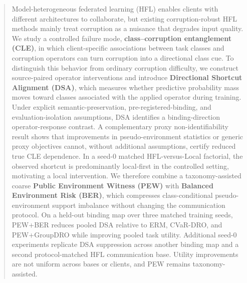 \begin{abstract}

Model-heterogeneous federated learning (HFL) enables clients with different architectures to collaborate, but existing corruption-robust HFL methods mainly treat corruption as a nuisance that degrades input quality. We study a controlled failure mode, \textbf{class--corruption entanglement (CLE)}, in which client-specific associations between task classes and corruption operators can turn corruption into a directional class cue. To distinguish this behavior from ordinary corruption difficulty, we construct source-paired operator interventions and introduce \textbf{Directional Shortcut Alignment (DSA)}, which measures whether predictive probability mass moves toward classes associated with the applied operator during training. Under explicit semantic-preservation, pre-registered-binding, and evaluation-isolation assumptions, DSA identifies a binding-direction operator-response contrast. A complementary proxy non-identifiability result shows that improvements in pseudo-environment statistics or generic proxy objectives cannot, without additional assumptions, certify reduced true CLE dependence. In a seed-0 matched HFL-versus-Local factorial, the observed shortcut is predominantly local-first in the controlled setting, motivating a local intervention. We therefore combine a taxonomy-assisted coarse \textbf{Public Environment Witness (PEW)} with \textbf{Balanced Environment Risk (BER)}, which compresses class-conditional pseudo-environment support imbalance without changing the communication protocol. On a held-out binding map over three matched training seeds, PEW+BER reduces pooled DSA relative to ERM, CVaR-DRO, and PEW+GroupDRO while improving pooled task utility. Additional seed-0 experiments replicate DSA suppression across another binding map and a second protocol-matched HFL communication base. Utility improvements are not uniform across bases or clients, and PEW remains taxonomy-assisted.

\end{abstract}

